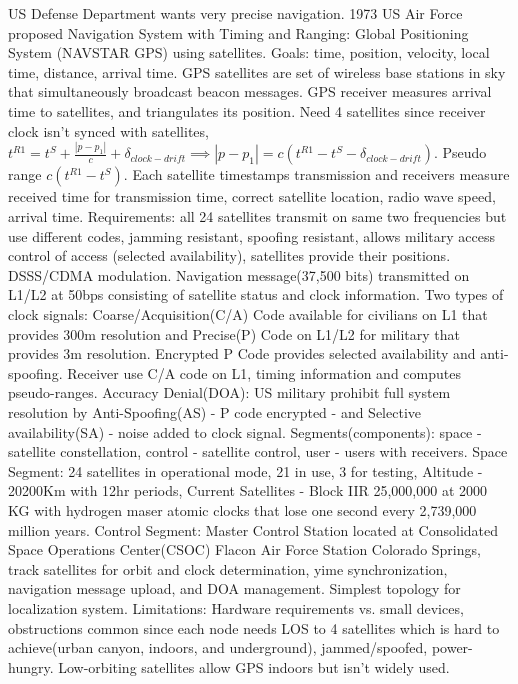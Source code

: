 \documentclass[9pt]{extarticle}
\begin{document}
\begin{multicols}{2}
US Defense Department wants very precise navigation. 1973 US Air Force proposed Navigation System with Timing and Ranging: Global Positioning System (NAVSTAR GPS) using satellites. Goals: time, position, velocity, local time, distance, arrival time. GPS satellites are set of wireless base stations in sky that simultaneously broadcast beacon messages.  GPS receiver measures arrival time to satellites, and triangulates its position. Need 4 satellites since receiver clock isn't synced with satellites, $t^{R1}=t^S+\frac{|p-p_1|}{c}+\delta_{clock-drift}\implies{|p-p_1|=c(t^{R1}-t^S-\delta_{clock-drift})}$. Pseudo range $c(t^{R1}-t^S)$. Each satellite timestamps transmission and receivers measure received time for transmission time, correct satellite location, radio wave speed, arrival time. Requirements: all 24 satellites transmit on same two frequencies but use different codes, jamming resistant, spoofing resistant, allows military access control of access (selected availability), satellites provide their positions. DSSS/CDMA modulation. Navigation message(37,500 bits) transmitted on L1/L2 at 50bps consisting of satellite status and clock information. Two types of clock signals: Coarse/Acquisition(C/A) Code available for civilians on L1 that provides 300m resolution and Precise(P) Code on L1/L2 for military that provides 3m resolution. Encrypted P Code provides selected availability and anti-spoofing. Receiver use C/A code on L1, timing information and computes pseudo-ranges. Accuracy Denial(DOA): US military prohibit full system resolution by Anti-Spoofing(AS) - P code encrypted - and Selective availability(SA) - noise added to clock signal. Segments(components): space - satellite constellation, control - satellite control, user - users with receivers. Space Segment: 24 satellites in operational mode, 21 in use, 3 for testing, Altitude - 20200Km with 12hr periods, Current Satellites - Block IIR 25,000,000 at 2000 KG with hydrogen maser atomic clocks that lose one second every 2,739,000 million years. Control Segment: Master Control Station located at Consolidated Space Operations Center(CSOC) Flacon Air Force Station Colorado Springs, track satellites for orbit and clock determination, yime synchronization, navigation message upload, and DOA management. Simplest topology for localization system. Limitations: Hardware requirements vs. small devices, obstructions common since each node needs LOS to 4 satellites which is hard to achieve(urban canyon, indoors, and underground), jammed/spoofed, power-hungry. Low-orbiting satellites allow GPS indoors but isn't widely used.


\end{multicols}
\end{document}
